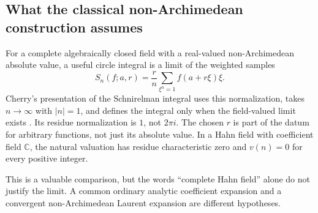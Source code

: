 \documentclass[11pt,letterpaper]{article}
\theoremstyle{definition}
\theoremstyle{remark}
\newcommand{\C}{\mathbb C}\newcommand{\R}{\mathbb R}\newcommand{\Q}{\mathbb Q}\newcommand{\Z}{\mathbb Z}\newcommand{\N}{\mathbb N}
\numberwithin{equation}{section}
\begin{document}
\subsection{What the classical non-Archimedean construction assumes}
For a complete algebraically closed field with a real-valued non-Archimedean absolute value, a useful circle integral is a limit of the weighted samples
\begin{equation}\label{eq:samples}
 S_n(f;a,r)=\frac r n\sum_{\xi^n=1}f(a+r\xi)\xi.
\end{equation}
Cherry's presentation of the Schnirelman integral uses this normalization, takes $n\to\infty$ with $|n|=1$, and defines the integral only when the field-valued limit exists \cite[\S1.3]{Cherry}. Its residue normalization is $1$, not $2\pi i$. The chosen $r$ is part of the datum for arbitrary functions, not just its absolute value. In a Hahn field with coefficient field $\C$, the natural valuation has residue characteristic zero and $v(n)=0$ for every positive integer.

This is a valuable comparison, but the words ``complete Hahn field'' alone do not justify the limit. A common ordinary analytic coefficient expansion and a convergent non-Archimedean Laurent expansion are different hypotheses.
\end{document}
